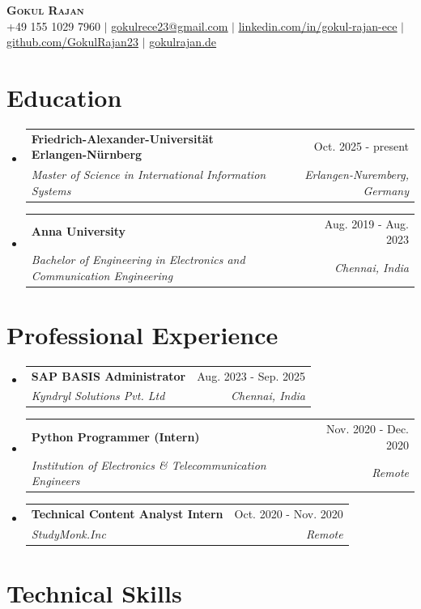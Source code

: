 \documentclass[letterpaper,10.95pt]{article}
\makeatletter
\newcommand{\resumeSubheading}[4]{
  \vspace{-2pt}\item
    \begin{tabular*}{0.97\textwidth}[t]{l@{\extracolsep{\fill}}r}
      \textbf{#1} & #2 \\
      \textit{\small#3} & \textit{\small #4} \\
    \end{tabular*}\vspace{-7pt}
}
\newcommand{\resumeSubHeadingListStart}{\begin{itemize}[leftmargin=0.15in, label={}]}
\newcommand{\resumeSubHeadingListEnd}{\end{itemize}}
\newcommand{\resumeItemListStart}{\begin{itemize}}
\newcommand{\resumeItemListEnd}{\end{itemize}\vspace{-5pt}}
\makeatother
\begin{document}
\begin{center}
    \textbf{\Huge \scshape Gokul Rajan} \\ \vspace{3pt}
    \small %
    \small +49 155 1029 7960 $|$ \href{mailto:gokulrece23@gmail.com}{\underline{gokulrece23@gmail.com}} $|$
    \href{https://linkedin.com/in/gokul-rajan-ece}{\underline{linkedin.com/in/gokul-rajan-ece}} $|$
    \href{https://github.com/GokulRajan23}{\underline{github.com/GokulRajan23}} $|$
    \href{https://www.gokulrajan.de/}{\underline{gokulrajan.de}}
\end{center}


\section{Education}
  \resumeSubHeadingListStart
    \resumeSubheading
      {Friedrich-Alexander-Universität Erlangen-Nürnberg}{Oct. 2025 - present}
      {Master of Science in International Information Systems}{Erlangen-Nuremberg, Germany}
    \resumeSubheading
      {Anna University}{Aug. 2019 - Aug. 2023}
      {Bachelor of Engineering in Electronics and Communication Engineering}{Chennai, India}
  \resumeSubHeadingListEnd


\section{Professional Experience}
  \resumeSubHeadingListStart

    \resumeSubheading
      {SAP BASIS Administrator}{Aug. 2023 - Sep. 2025}
      {Kyndryl Solutions Pvt. Ltd}{Chennai, India}
\resumeItemListStart
\resumeItemListEnd

    \resumeSubheading
      {Python Programmer (Intern)}{Nov. 2020 - Dec. 2020}
      {Institution of Electronics \& Telecommunication Engineers}{Remote}
\resumeItemListStart
\resumeItemListEnd

    \resumeSubheading
      {Technical Content Analyst Intern}{Oct. 2020 - Nov. 2020}
      {StudyMonk.Inc}{Remote}
\resumeItemListStart
\resumeItemListEnd

  \resumeSubHeadingListEnd


\section*{Technical Skills}
\end{document}
